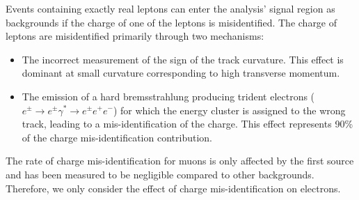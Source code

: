 Events containing exactly real leptons can enter the analysis' signal region as backgrounds if the charge of one of the leptons is misidentified.
The charge of leptons are misidentified primarily through two mechanisms:
\begin{itemize}
\item The incorrect measurement of the sign of the track curvature. This effect is dominant at small curvature corresponding to high transverse momentum.
\item The emission of a hard bremsstrahlung producing trident electrons ($e^{\pm} \rightarrow e^{\pm}\gamma^{*} \rightarrow e^{\pm}e^{+}e^{-}$) for which the energy cluster is assigned to the wrong track, leading to a mis-identification of the charge. 
This effect represents 90\% of the charge mis-identification contribution.
\end{itemize}
The rate of charge mis-identification for muons is only affected by the first source and has been measured to be negligible compared to other backgrounds.
Therefore, we only consider the effect of charge mis-identification on electrons.

